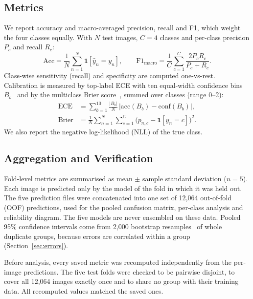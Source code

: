 \documentclass[journal,onecolumn]{IEEEtran}
\begin{document}
\subsection{Metrics}
We report accuracy and macro-averaged precision, recall and F1, which weight the four classes equally. With $N$ test images, $C = 4$ classes and per-class precision $P_c$ and recall $R_c$:
\begin{equation}
\mathrm{Acc} = \frac{1}{N}\sum_{n=1}^{N} \mathbf{1}[\hat{y}_n = y_n], \qquad \mathrm{F1}_{\mathrm{macro}} = \frac{1}{C}\sum_{c=1}^{C} \frac{2 P_c R_c}{P_c + R_c}.
\end{equation}
Class-wise sensitivity (recall) and specificity are computed one-vs-rest. Calibration is measured by top-label ECE with ten equal-width confidence bins $B_b$~\cite{guo2017calibration,naeini2015bbq} and by the multiclass Brier score~\cite{brier1950verification}, summed over classes (range 0--2):
\begin{align}
\mathrm{ECE} &= \sum_{b=1}^{10} \frac{|B_b|}{N}\,\big|\mathrm{acc}(B_b) - \mathrm{conf}(B_b)\big|, \\
\mathrm{Brier} &= \frac{1}{N}\sum_{n=1}^{N}\sum_{c=1}^{C}\big(p_{n,c} - \mathbf{1}[y_n = c]\big)^2.
\end{align}
We also report the negative log-likelihood (NLL) of the true class.

\subsection{Aggregation and Verification}
Fold-level metrics are summarised as mean $\pm$ sample standard deviation ($n = 5$). Each image is predicted only by the model of the fold in which it was held out. The five prediction files were concatenated into one set of 12,064 out-of-fold (OOF) predictions, used for the pooled confusion matrix, per-class analysis and reliability diagram. The five models are never ensembled on these data. Pooled 95\% confidence intervals come from 2,000 bootstrap resamples~\cite{efron1993bootstrap} of whole duplicate groups, because errors are correlated within a group (Section~\ref{sec:errors}).

Before analysis, every saved metric was recomputed independently from the per-image predictions. The five test folds were checked to be pairwise disjoint, to cover all 12,064 images exactly once and to share no group with their training data. All recomputed values matched the saved ones.

\end{document}
